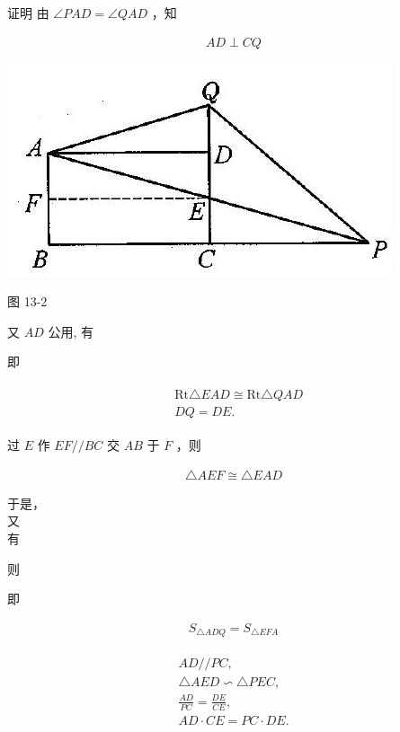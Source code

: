 \documentclass[10pt]{article}
\begin{document}
证明 由 $\angle P A D=\angle Q A D$ ，知

\begin{align*}
A D \perp C Q
\end{align*}

\begin{center}
\includegraphics[max width=\textwidth]{2024_10_30_2c8f45efd4a519b08e1ag-120}
\end{center}

图 13-2

又 $A D$ 公用, 有

即

\begin{align*}
\begin{aligned}
& \mathrm{Rt} \triangle E A D \cong \mathrm{Rt} \triangle Q A D \\
& D Q=D E .
\end{aligned}
\end{align*}

过 $E$ 作 $E F / / B C$ 交 $A B$ 于 $F$ ，则

\begin{align*}
\triangle A E F \cong \triangle E A D
\end{align*}

于是，\\
又\\
有

则

即

\begin{align*}
S_{\triangle A D Q}=S_{\triangle E F A}
\end{align*}

\begin{align*}
\begin{gathered}
A D / / P C, \\
\triangle A E D \backsim \triangle P E C, \\
\frac{A D}{P C}=\frac{D E}{C E}, \\
A D \cdot C E=P C \cdot D E .
\end{gathered}
\end{align*}
\end{document}

